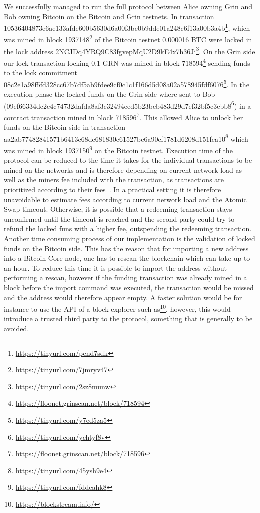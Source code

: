 We successfully managed to run the full protocol between Alice owning Grin and Bob owning Bitcoin on the Bitcoin and Grin testnets.
In transaction \\10536404873e6ae133afde600b5630d6a00f3be0b9dde01a248c6f13a00b3a4b\footnote{\url{https://tinyurl.com/pend7sdk}}, which was mined in block 1937148\footnote{\url{https://tinyurl.com/7jmryv47}} of the Bitcoin testnet 0.000016 BTC were locked in the lock address 2NCJDq4YRQ9C83fgvepMqU2D9kE4x7h36Ji\footnote{\url{https://tinyurl.com/2sz8munw}}.
On the Grin side our lock transaction locking 0.1 GRN was mined in block 718594\footnote{\url{https://floonet.grinscan.net/block/718594}} sending funds to the lock commitment \\08c2e1a98f5fd328cc67b7df5ab9fdee9cf0c1c1f166d5d08a02a578945fdf6076\footnote{\url{https://tinyurl.com/y7ed5za5}}.
In the execution phase the locked funds on the Grin side where sent to Bob \\(09ef66334dc2e4c74732dafda8af3c32494eed5b23beb483d29d7ef32bf5c3ebb8\footnote{\url{https://tinyurl.com/ychtyf8v}}) in a contract transaction mined in block 718596\footnote{\url{https://floonet.grinscan.net/block/718596}}.
This allowed Alice to unlock her funds on the Bitcoin side in transaction \\ aa2ab77482841571b6413c68de681830c61527bc6a90ef1781d6208d151fea10\footnote{\url{https://tinyurl.com/45ysh9e4}} which was mined in block 1937150\footnote{\url{https://tinyurl.com/fddeahk8}} on the Bitcoin testnet.
Execution time of the protocol can be reduced to the time it takes for the individual transactions to be mined on the networks and is therefore depending on current network load as well as the miners fee included with the transaction, as transactions are prioritized according to their fees~\cite{kasahara2016effect}.
In a practical setting it is therefore unavoidable to estimate fees according to current network load and the Atomic Swap timeout.
Otherwise, it is possible that a redeeming transaction stays unconfirmed until the timeout is reached and the second party could try to refund the locked funs with a higher fee, outspending the redeeming transaction.
Another time consuming process of our implementation is the validation of locked funds on the Bitcoin side.
This has the reason that for importing a new address into a Bitcoin Core node, one has to rescan the blockchain which can take up to an hour.
To reduce this time it is possible to import the address without performing a rescan, however if the funding transaction was already mined in a block before the import command was executed, the transaction would be missed and the address would therefore appear empty.
A faster solution would be for instance to use the API of a block explorer such as\footnote{\url{https://blockstream.info/}}, however, this would introduce a trusted third party to the protocol, something that is generally to be avoided.
